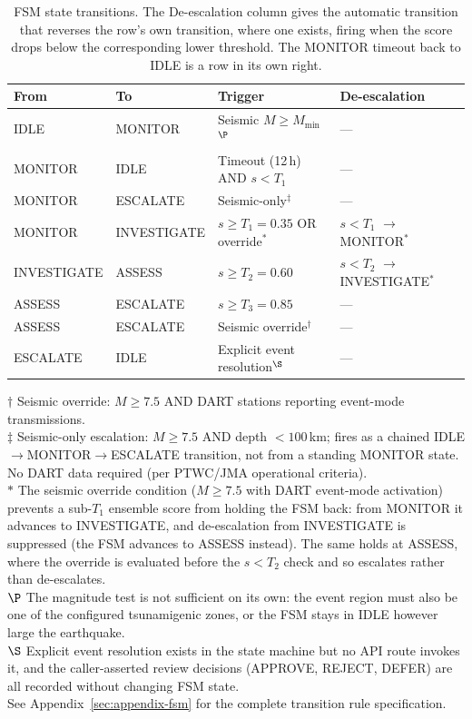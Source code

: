 \documentclass{article}
\begin{document}
\begin{table}[t]
\centering
\caption{FSM state transitions. The De-escalation column gives the
  automatic transition that reverses the row's own transition, where one
  exists, firing when the score drops below the corresponding lower
  threshold.  The MONITOR timeout back to IDLE is a row in its own right.}
\label{tab:fsm}
\begin{tabular}{llll}
\toprule
From & To & Trigger & De-escalation \\
\midrule
IDLE        & MONITOR     & Seismic $M \geq M_\text{min}$$^\P$ & --- \\
MONITOR     & IDLE        & Timeout (12\,h) AND $s < T_1$ & --- \\
MONITOR     & ESCALATE    & Seismic-only$^\ddagger$        & --- \\
MONITOR     & INVESTIGATE & $s \geq T_1 = 0.35$ OR override$^*$ & $s < T_1$ $\to$ MONITOR$^*$ \\
INVESTIGATE & ASSESS      & $s \geq T_2 = 0.60$           & $s < T_2$ $\to$ INVESTIGATE$^*$ \\
ASSESS      & ESCALATE    & $s \geq T_3 = 0.85$           & --- \\
ASSESS      & ESCALATE    & Seismic override$^\dagger$    & --- \\
ESCALATE    & IDLE        & Explicit event resolution$^\S$ & --- \\
\bottomrule
\end{tabular}
\end{table}
{\footnotesize $\dagger$ Seismic override: $M \geq 7.5$ AND DART stations
reporting event-mode transmissions.\\
$\ddagger$ Seismic-only escalation: $M \geq 7.5$ AND depth $< 100$\,km;
fires as a chained IDLE$\to$MONITOR$\to$ESCALATE transition,
not from a standing MONITOR state.
No DART data required (per PTWC/JMA operational criteria).\\
$*$ The seismic override condition ($M \geq 7.5$ with DART event-mode
activation) prevents a sub-$T_1$ ensemble score from holding the FSM
back: from MONITOR it advances to INVESTIGATE, and de-escalation from
INVESTIGATE is suppressed (the FSM advances to ASSESS instead).  The
same holds at ASSESS, where the override is evaluated before the
$s < T_2$ check and so escalates rather than de-escalates.\\
$\P$ The magnitude test is not sufficient on its own: the event region
must also be one of the configured tsunamigenic zones, or the FSM stays in
IDLE however large the earthquake.\\
$\S$ Explicit event resolution exists in the state machine but no
API route invokes it, and the
caller-asserted review decisions (APPROVE, REJECT, DEFER) are all
recorded without changing FSM state.\\
See Appendix~\ref{sec:appendix-fsm} for the complete transition rule
specification.}
\end{document}
